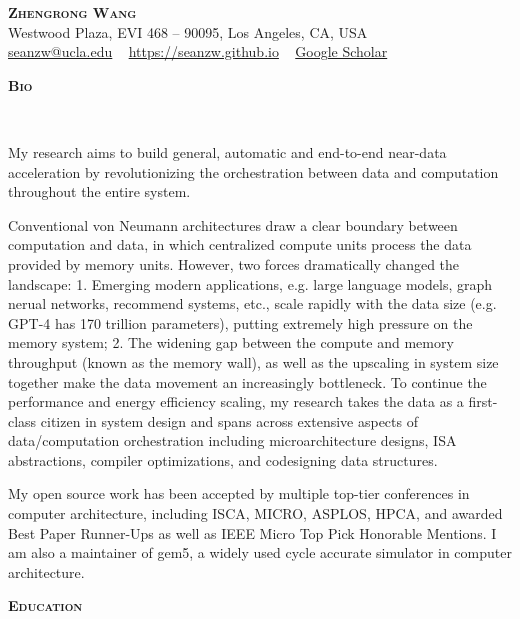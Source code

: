 \documentclass[a4paper]{article}
\def\justifying{%
  \rightskip=0pt
  \spaceskip=0pt
  \xspaceskip=0pt
  \relax
}
\newenvironment{changemargin}[2]{%
  \begin{list}{}{%
    \setlength{\topsep}{0pt}%
    \setlength{\leftmargin}{#1}%
    \setlength{\rightmargin}{#2}%
    \setlength{\listparindent}{\parindent}%
    \setlength{\itemindent}{\parindent}%
    \setlength{\parsep}{\parskip}%
  }%
  \item[]}{\end{list}
}
\newcommand{\lineover}{
	\begin{changemargin}{-0.05in}{-0.05in}
		\vspace*{-8pt}
		\hrulefill \\
		\vspace*{-2pt}
	\end{changemargin}
}
\newcommand{\header}[1]{
	\begin{changemargin}{-0.5in}{-0.5in}
		\scshape{\large \textbf{#1}}\\
  	\lineover
	\end{changemargin}
}
\newcommand{\contact}[4]{
	\begin{changemargin}{-0.5in}{-0.5in}
		\begin{center}
			{\LARGE \scshape \textbf{#1}}\\ \smallskip
			404 Westwood Plaza, EVI 468 – 90095, Los Angeles, CA, USA\\ \smallskip
			{\href{#2}{#2}} ~ \smallskip 
			{\href{#3}{#3}} ~
			{\href{#4}{Google Scholar}}\smallskip
		\end{center}
	\end{changemargin}
}
\newenvironment{body} {
	\vspace*{-16pt}
	\begin{changemargin}{-0.5in}{-0.5in}
  }	
	{\end{changemargin}
}
\begin{document}
\contact{Zhengrong Wang}{seanzw@ucla.edu}{https://seanzw.github.io}{https://scholar.google.com/citations?user=h\_GwGfQAAAAJ\&hl=en}

\header{Bio}

\begin{body}
	\vspace{14pt}
	\justifying
    \setlength{\parindent}{20pt}%
	
	\indent
	My research aims to build general, automatic and end-to-end near-data acceleration 
	by revolutionizing the orchestration between data and computation throughout the
	entire system.

	\indent
	Conventional von Neumann architectures draw a clear boundary between computation and
	data, in which centralized compute units process the data provided by memory units.
	However, two forces dramatically changed the landscape: 1. Emerging modern applications,
	e.g. large language models, graph nerual networks, recommend systems, etc., scale rapidly
	with the data size (e.g. GPT-4 has 170 trillion parameters), putting extremely high
	pressure on the memory system; 2. The widening gap between the compute and memory
	throughput (known as the memory wall), as well as the upscaling in system size together
	make the data movement an increasingly bottleneck. To continue the performance and
	energy efficiency scaling, my research takes the data as a first-class citizen in
	system design and spans across extensive aspects of data/computation orchestration
	including microarchitecture designs, ISA abstractions, compiler optimizations, and
	codesigning data structures.

	\indent
	My open source work has been accepted by
	multiple top-tier conferences in computer architecture, including ISCA, MICRO, ASPLOS,
	HPCA, and awarded Best Paper Runner-Ups as well as IEEE Micro Top Pick Honorable
	Mentions. I am also a maintainer of gem5, a widely used cycle accurate simulator in
	computer architecture.

\end{body}

\smallskip
\smallskip

\header{Education}
\end{document}
